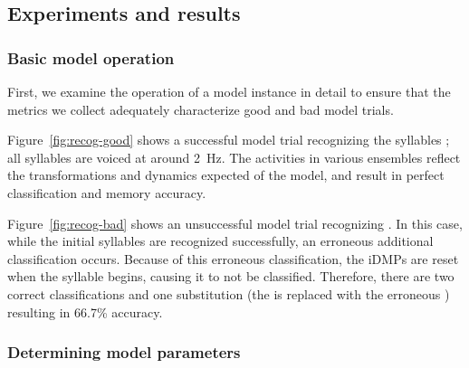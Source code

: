 \subsection{Experiments and results}

\subsubsection{Basic model operation}

First, we examine the operation
of a model instance in detail
to ensure that the metrics we collect
adequately characterize
good and bad model trials.

Figure~\ref{fig:recog-good} shows
a successful model trial
recognizing the syllables
;
all syllables are voiced
at around 2~Hz.
The activities in various ensembles
reflect the transformations
and dynamics expected of the model,
and result in
perfect classification and memory accuracy.



Figure~\ref{fig:recog-bad}
shows an unsuccessful model trial
recognizing .
In this case, while the initial
\ipa{[blA ti]} syllables
are recognized successfully,
an erroneous additional
\ipa{[ti]} classification occurs.
Because of this erroneous classification,
the iDMPs are reset when
the \ipa{[dAs]} syllable begins,
causing it to not be classified.
Therefore, there are two correct
classifications and one substitution
(the \ipa{[dAs]} is replaced with the
erroneous \ipa{[ti]})
resulting in 66.7\% accuracy.

\subsubsection{Determining model parameters}

